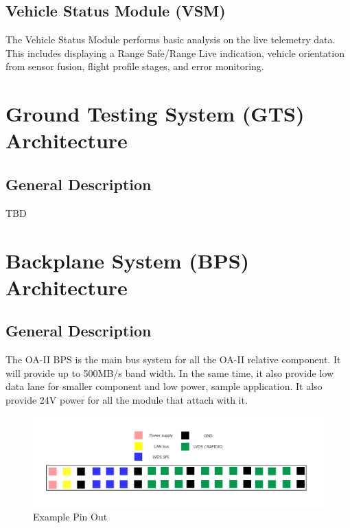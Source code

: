 \documentclass[12pt,article]{memoir}
\begin{document}
\section{Vehicle Status Module (VSM)}
The Vehicle Status Module performs basic analysis on the live telemetry data. This includes displaying a Range Safe/Range Live indication, vehicle orientation from sensor fusion, flight profile stages, and error monitoring.
\newpage
\chapter{Ground Testing System (GTS) Architecture}
\section{General Description}
TBD
\newpage

\chapter{Backplane System (BPS) Architecture}
\section{General Description}
The OA-II BPS is the main bus system for all the OA-II relative component. It will provide up to 500MB/s band width. In the same time, it also provide low data lane for smaller component and low power, sample application. It also provide 24V power for all the module that attach with it.
\begin{figure}[h]
\includegraphics[width=\textwidth]{ES00002_BPS_Pin.png}
 \caption{Example Pin Out}	
\end{figure}
\end{document}
